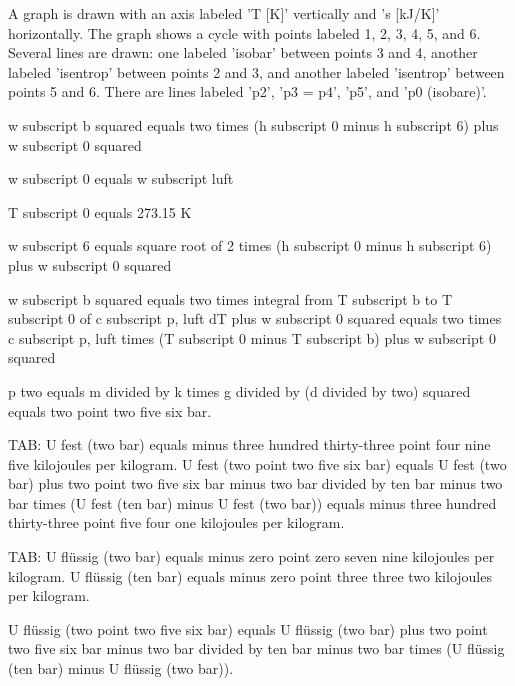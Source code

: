 A graph is drawn with an axis labeled 'T [K]' vertically and 's [kJ/K]' horizontally. The graph shows a cycle with points labeled 1, 2, 3, 4, 5, and 6. Several lines are drawn: one labeled 'isobar' between points 3 and 4, another labeled 'isentrop' between points 2 and 3, and another labeled 'isentrop' between points 5 and 6. There are lines labeled 'p2', 'p3 = p4', 'p5', and 'p0 (isobare)'.

w subscript b squared equals two times (h subscript 0 minus h subscript 6) plus w subscript 0 squared

w subscript 0 equals w subscript luft

T subscript 0 equals 273.15 K

w subscript 6 equals square root of 2 times (h subscript 0 minus h subscript 6) plus w subscript 0 squared

w subscript b squared equals two times integral from T subscript b to T subscript 0 of c subscript p, luft dT plus w subscript 0 squared equals two times c subscript p, luft times (T subscript 0 minus T subscript b) plus w subscript 0 squared

p two equals m divided by k times g divided by (d divided by two) squared equals two point two five six bar.

TAB:
U fest (two bar) equals minus three hundred thirty-three point four nine five kilojoules per kilogram.
U fest (two point two five six bar) equals U fest (two bar) plus two point two five six bar minus two bar divided by ten bar minus two bar times (U fest (ten bar) minus U fest (two bar)) equals minus three hundred thirty-three point five four one kilojoules per kilogram.

TAB:
U flüssig (two bar) equals minus zero point zero seven nine kilojoules per kilogram.
U flüssig (ten bar) equals minus zero point three three two kilojoules per kilogram.

U flüssig (two point two five six bar) equals U flüssig (two bar) plus two point two five six bar minus two bar divided by ten bar minus two bar times (U flüssig (ten bar) minus U flüssig (two bar)).